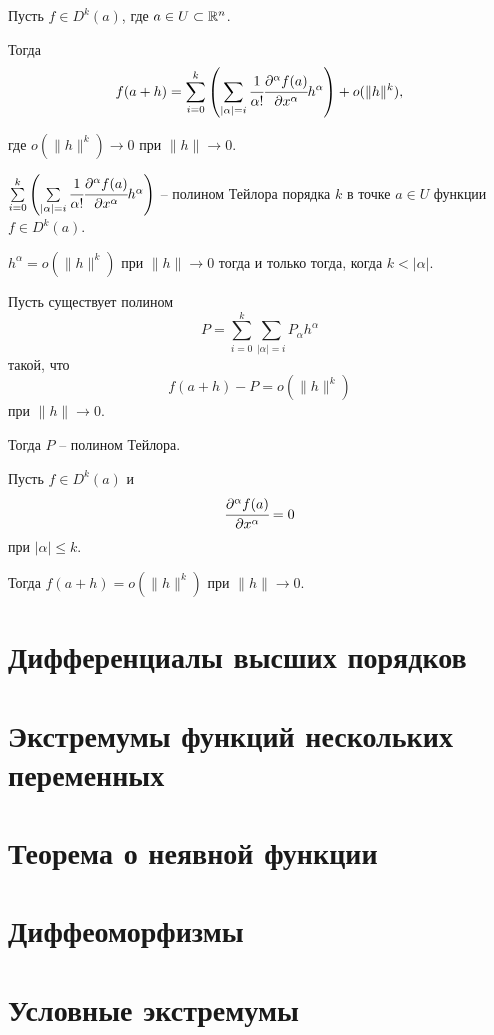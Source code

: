 	\begin{theorem}
		Пусть $f\in D^k(a)$, где $a\in U \subset \mathbb{R}^n$.
		
		Тогда
		$$
			f(a+h) = \sum\limits_{i=0}^k \left( \sum\limits_{|\alpha|=i} \cfrac {1}{\alpha!}  \cfrac {\partial^\alpha f(a)}{\partial x^\alpha} h^\alpha\right) + o(\|h\|^k),
		$$
		
		где $o(\|h\|^k) \to 0$ при $\|h\|\to 0$.
	\end{theorem}

	\begin{mdef}
		$
		\sum\limits_{i=0}^k \left( \sum\limits_{|\alpha|=i} \cfrac {1}{\alpha!}  \cfrac {\partial^\alpha f(a)}{\partial x^\alpha} h^\alpha\right)
		$ -- полином Тейлора порядка $k$ в точке $a\in U$ функции $f\in D^k(a)$.
	\end{mdef}

	\begin{lemma}
		$h^\alpha = o(\|h\|^k)$ при $\|h\|\to0$ тогда и только тогда, когда $k < |\alpha|$.
	\end{lemma}

	\begin{theorem}
		Пусть существует полином 
		$$
			P = \sum \limits_{i=0}^k \sum\limits_{|\alpha|=i} P_\alpha h^\alpha
		$$
		такой, что 
		$$
			f(a+h) - P = o(\|h\|^k)
		$$ при $\|h\|\to 0$.
		
		Тогда $P$ -- полином Тейлора.
	\end{theorem}
	
	\begin{corollary}
		Пусть $f\in D^k(a)$ и $$\cfrac {\partial^\alpha f(a)} {\partial x^\alpha} = 0$$ при $|\alpha| \le k$.
		
		Тогда $f(a+h) = o(\|h\|^k)$ при $\|h\|\to0$.
	\end{corollary}
	
	\section{Дифференциалы высших порядков}
	
	\section{Экстремумы функций нескольких переменных}
	
	\section{Теорема о неявной функции}
	
	\section{Диффеоморфизмы}
	
	\section{Условные экстремумы} 